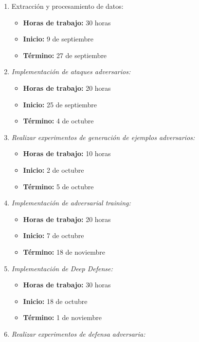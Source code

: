 \documentclass[conference]{IEEEtran}
\begin{document}
\begin{enumerate}
    \item \textit{}{Extracción y procesamiento de datos:} 
        \begin{itemize}
        \item \textbf{Horas de trabajo:} 30 horas
        \item \textbf{Inicio:}  9 de septiembre
        \item \textbf{Término:} 27 de septiembre
    \end{itemize}
    \item \textit{Implementación de ataques adversarios:} 
        \begin{itemize}
        \item \textbf{Horas de trabajo:} 20 horas
        \item \textbf{Inicio:} 25 de septiembre
        \item \textbf{Término:} 4 de octubre
    \end{itemize}
    \item \textit{Realizar experimentos de generación de ejemplos adversarios:} 
    \begin{itemize}
        \item \textbf{Horas de trabajo:} 10 horas
        \item \textbf{Inicio:} 2 de octubre
        \item \textbf{Término:} 5 de octubre
    \end{itemize}
    \item \textit{Implementación de \textit{adversarial training}:}
        \begin{itemize}
        \item \textbf{Horas de trabajo:} 20 horas
        \item \textbf{Inicio:} 7 de octubre
        \item \textbf{Término:} 18 de noviembre
    \end{itemize}
    \item \textit{Implementación de \textit{Deep Defense}:}
        \begin{itemize}
        \item \textbf{Horas de trabajo:} 30 horas
        \item \textbf{Inicio:} 18 de octubre
        \item \textbf{Término:} 1 de noviembre
    \end{itemize}
    \item \textit{Realizar experimentos de defensa adversaria:}

\end{enumerate}
\end{document}
